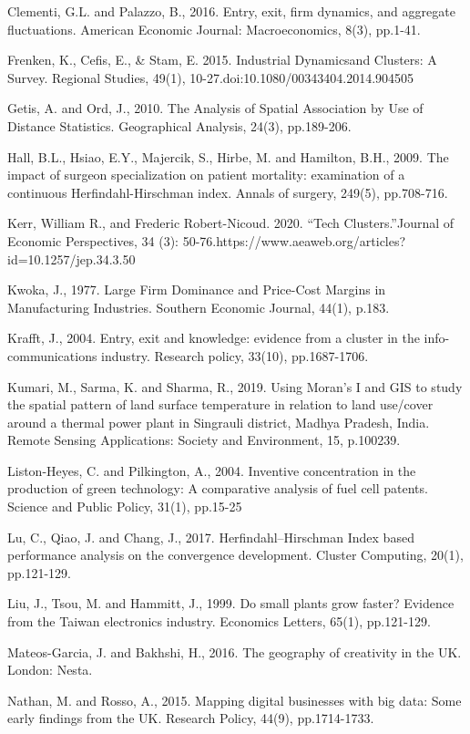 \documentclass[
  12pt,
  oneside]{book}
\begin{document}
Clementi, G.L. and Palazzo, B., 2016. Entry, exit, firm dynamics, and aggregate fluctuations. American Economic Journal: Macroeconomics, 8(3), pp.1-41.

Frenken, K., Cefis, E., \& Stam, E. 2015. Industrial Dynamicsand Clusters: A Survey. Regional Studies, 49(1), 10-27.doi:10.1080/00343404.2014.904505

Getis, A. and Ord, J., 2010. The Analysis of Spatial Association by Use of Distance Statistics. Geographical Analysis, 24(3), pp.189-206.

Hall, B.L., Hsiao, E.Y., Majercik, S., Hirbe, M. and Hamilton, B.H., 2009. The impact of surgeon specialization on patient mortality: examination of a continuous Herfindahl-Hirschman index. Annals of surgery, 249(5), pp.708-716.

Kerr, William R., and Frederic Robert-Nicoud. 2020. ``Tech Clusters.''Journal of Economic Perspectives, 34 (3): 50-76.https://www.aeaweb.org/articles?id=10.1257/jep.34.3.50

Kwoka, J., 1977. Large Firm Dominance and Price-Cost Margins in Manufacturing Industries. Southern Economic Journal, 44(1), p.183.

Krafft, J., 2004. Entry, exit and knowledge: evidence from a cluster in the info-communications industry. Research policy, 33(10), pp.1687-1706.

Kumari, M., Sarma, K. and Sharma, R., 2019. Using Moran's I and GIS to study the spatial pattern of land surface temperature in relation to land use/cover around a thermal power plant in Singrauli district, Madhya Pradesh, India. Remote Sensing Applications: Society and Environment, 15, p.100239.

Liston-Heyes, C. and Pilkington, A., 2004. Inventive concentration in the production of green technology: A comparative analysis of fuel cell patents. Science and Public Policy, 31(1), pp.15-25

Lu, C., Qiao, J. and Chang, J., 2017. Herfindahl--Hirschman Index based performance analysis on the convergence development. Cluster Computing, 20(1), pp.121-129.

Liu, J., Tsou, M. and Hammitt, J., 1999. Do small plants grow faster? Evidence from the Taiwan electronics industry. Economics Letters, 65(1), pp.121-129.

Mateos-Garcia, J. and Bakhshi, H., 2016. The geography of creativity in the UK. London: Nesta.

Nathan, M. and Rosso, A., 2015. Mapping digital businesses with big data: Some early findings from the UK. Research Policy, 44(9), pp.1714-1733.
\end{document}
